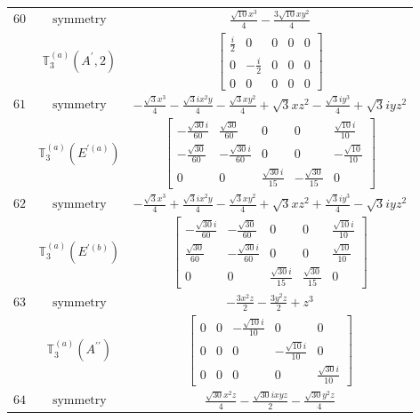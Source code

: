 \documentclass[fleqn,8pt,landscape]{jsarticle}
\begin{document}
\begin{longtable}{ccc}
$ 60 $ & $ \text{symmetry} $ & $ \frac{\sqrt{10} x^{3}}{4} - \frac{3 \sqrt{10} x y^{2}}{4} $ \\
$  $ & $ \mathbb{T}_{3}^{(a)}(A^{\prime},2) $ & $ \begin{bmatrix} \frac{i}{2} & 0 & 0 & 0 & 0 \\ 0 & - \frac{i}{2} & 0 & 0 & 0 \\ 0 & 0 & 0 & 0 & 0 \end{bmatrix} $ \\ \hline
$ 61 $ & $ \text{symmetry} $ & $ - \frac{\sqrt{3} x^{3}}{4} - \frac{\sqrt{3} i x^{2} y}{4} - \frac{\sqrt{3} x y^{2}}{4} + \sqrt{3} x z^{2} - \frac{\sqrt{3} i y^{3}}{4} + \sqrt{3} i y z^{2} $ \\
$  $ & $ \mathbb{T}_{3}^{(a)}(E^{\prime(a)}) $ & $ \begin{bmatrix} - \frac{\sqrt{30} i}{60} & \frac{\sqrt{30}}{60} & 0 & 0 & \frac{\sqrt{10} i}{10} \\ - \frac{\sqrt{30}}{60} & - \frac{\sqrt{30} i}{60} & 0 & 0 & - \frac{\sqrt{10}}{10} \\ 0 & 0 & \frac{\sqrt{30} i}{15} & - \frac{\sqrt{30}}{15} & 0 \end{bmatrix} $ \\ \hline
$ 62 $ & $ \text{symmetry} $ & $ - \frac{\sqrt{3} x^{3}}{4} + \frac{\sqrt{3} i x^{2} y}{4} - \frac{\sqrt{3} x y^{2}}{4} + \sqrt{3} x z^{2} + \frac{\sqrt{3} i y^{3}}{4} - \sqrt{3} i y z^{2} $ \\
$  $ & $ \mathbb{T}_{3}^{(a)}(E^{\prime(b)}) $ & $ \begin{bmatrix} - \frac{\sqrt{30} i}{60} & - \frac{\sqrt{30}}{60} & 0 & 0 & \frac{\sqrt{10} i}{10} \\ \frac{\sqrt{30}}{60} & - \frac{\sqrt{30} i}{60} & 0 & 0 & \frac{\sqrt{10}}{10} \\ 0 & 0 & \frac{\sqrt{30} i}{15} & \frac{\sqrt{30}}{15} & 0 \end{bmatrix} $ \\ \hline
$ 63 $ & $ \text{symmetry} $ & $ - \frac{3 x^{2} z}{2} - \frac{3 y^{2} z}{2} + z^{3} $ \\
$  $ & $ \mathbb{T}_{3}^{(a)}(A^{\prime\prime}) $ & $ \begin{bmatrix} 0 & 0 & - \frac{\sqrt{10} i}{10} & 0 & 0 \\ 0 & 0 & 0 & - \frac{\sqrt{10} i}{10} & 0 \\ 0 & 0 & 0 & 0 & \frac{\sqrt{30} i}{10} \end{bmatrix} $ \\ \hline
$ 64 $ & $ \text{symmetry} $ & $ \frac{\sqrt{30} x^{2} z}{4} - \frac{\sqrt{30} i x y z}{2} - \frac{\sqrt{30} y^{2} z}{4} $ \\

\end{longtable}
\end{document}

